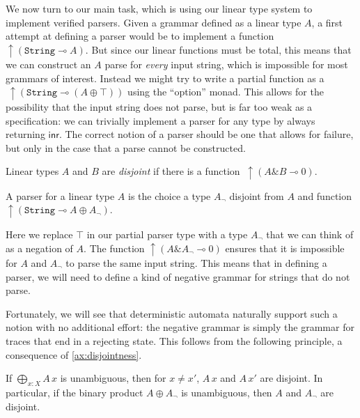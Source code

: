 \documentclass[acmsmall,nonacm]{acmart}
\newcommand{\inr}{\mathsf{inr}}
\newcommand{\lto}{\multimap}
\newcommand{\StringGram}{\texttt{String}}
\newcommand{\ltonl}[1]{~\uparrow #1}
\newcommand{\LinSigTy}[3]{\textstyle\bigoplus_{#1 : #2} #3}
\newcommand{\agdalogo}{%
  \usebox{\logoagdabox}}%
\newcommand{\zenodolink}{https://zenodo.org/records/15049780}
\newcommand{\Agda}{\href{\zenodolink}{\agdalogo}}
\begin{document}
{We now turn to our main task, which is using our linear type system to
implement verified parsers. Given a grammar defined as a linear type
$A$, a first attempt at defining a parser would be to implement a
function $\uparrow{(\StringGram \lto A)}$. But since our linear functions
must be total, this means that we can construct an $A$ parse for
\emph{every} input string, which is impossible for most grammars of
interest. Instead we might try to write a partial function as a
$\ltonl{(\StringGram \lto (A \oplus \top))}$ using the ``option''
monad. This allows for the possibility that the input string does not
parse, but is far too weak as a specification: we can trivially
implement a parser for any type by always returning $\inr$. The
correct notion of a parser should be one that allows for failure, but
only in the case that a parse cannot be constructed.

\begin{definition}
  \label{def:disjoint}
  Linear types $A$ and $B$ are \emph{disjoint} if there is a function
  $\ltonl {\left( A \& B \lto 0 \right)}$.
\end{definition}

\begin{definition}
  \label{def:parser}
  A parser for a linear type $A$ is the choice a type $A_{\neg}$ disjoint from
  $A$ and function $\uparrow{(\StringGram \lto
    A \oplus A_{\neg})}$.
\end{definition}
Here we replace $\top$ in our partial parser type with a type
$A_{\neg}$ that we can think of as a negation of $A$. The function
$\uparrow{(A \& A_{\neg} \lto 0)}$ ensures that it is impossible for
$A$ and $A_{\neg}$ to parse the same input string. This means that in
defining a parser, we will need to define a kind of negative grammar
for strings that do not parse.

Fortunately, we will see that
deterministic automata naturally support such a notion with no
additional effort: the negative grammar is simply the grammar for
traces that end in a rejecting state. This follows from the following
principle, a consequence of \cref{ax:disjointness}.

\begin{lemma}[\Agda]
  \label{lem:unambig-to-disjoint}
  If $\LinSigTy{x}{X}{A\,x}$ is unambiguous, then for $x \neq x'$, $A\,x$ and $A\,x'$ are
  disjoint. In particular, if the binary product $A \oplus A_{\neg}$ is unambiguous, then
  $A$ and $A_{\neg}$ are disjoint.
\end{lemma}

}
\end{document}
